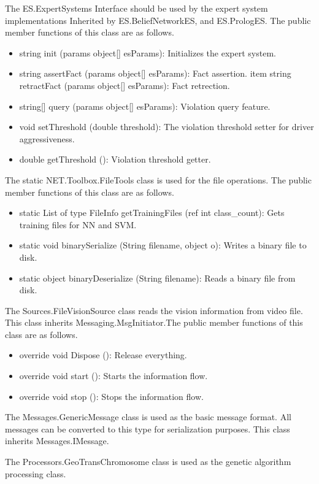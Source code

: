 \documentclass[a4paper,oneside,12pt]{report}
\begin{document}
The ES.ExpertSystems Interface should be used by the expert system implementations
Inherited by ES.BeliefNetworkES, and ES.PrologES.
The public member functions of this class are as follows.
\begin{itemize}
\item string init (params object[] esParams): Initializes the expert system. 
\item string assertFact (params object[] esParams): Fact assertion. 
item string retractFact (params object[] esParams): Fact retrection. 
\item string[] query (params object[] esParams): Violation query feature. 
\item void setThreshold (double threshold): The violation threshold setter for driver aggressiveness. 
\item double getThreshold (): Violation threshold getter. 
\end{itemize}

The static NET.Toolbox.FileTools class is used for the file operations. 
The public member functions of this class are as follows.
\begin{itemize}
\item static List of type FileInfo getTrainingFiles (ref int class\_count): Gets training files for NN and SVM. 
\item static void binarySerialize (String filename, object o): Writes a binary file to disk. 
\item static object binaryDeserialize (String filename): Reads a binary file from disk. 
\end{itemize}

The Sources.FileVisionSource class reads the vision information from video file.
This class inherits Messaging.MsgInitiator.The public member functions of this class are as follows.
\begin{itemize}
\item override void Dispose (): Release everything. 
\item override void start (): Starts the information flow. 
\item override void stop (): Stops the information flow. 
\end{itemize}

The Messages.GenericMessage class is used as the basic message format. All messages can be converted to this type for serialization purposes.
This class inherits Messages.IMessage.

The Processors.GeoTransChromosome class is used as the genetic algorithm processing class. 
\end{document}
